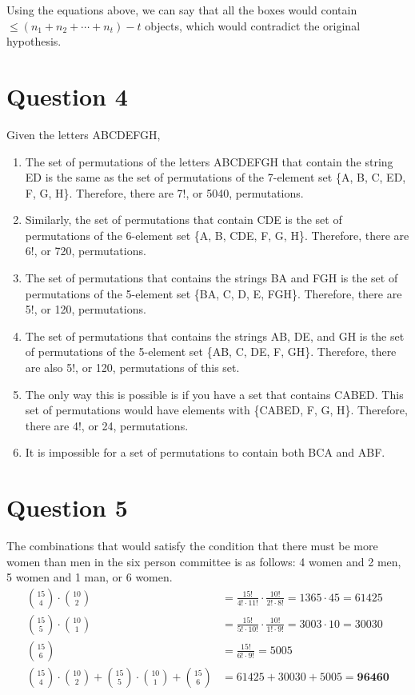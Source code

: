 \documentclass[letterpaper, 12pt]{article}
\begin{document}
Using the equations above, we can say that all the boxes would contain $\leq (n_1 + n_2 + \cdots + n_t) - t$ objects, which would contradict the original hypothesis.

\section*{Question 4}
Given the letters ABCDEFGH,

\begin{enumerate}
    \item The set of permutations of the letters ABCDEFGH that contain the string ED is the same as the set of permutations of the 7-element set \{A, B, C, ED, F, G, H\}. Therefore, there are 7!, or 5040, permutations.
    \item Similarly, the set of permutations that contain CDE is the set of permutations of the 6-element set \{A, B, CDE, F, G, H\}. Therefore, there are 6!, or 720, permutations.
    \item The set of permutations that contains the strings BA and FGH is the set of permutations of the 5-element set \{BA, C, D, E, FGH\}. Therefore, there are 5!, or 120, permutations.
    \item The set of permutations that contains the strings AB, DE, and GH is the set of permutations of the 5-element set \{AB, C, DE, F, GH\}. Therefore, there are also 5!, or 120, permutations of this set.
    \item The only way this is possible is if you have a set that contains CABED. This set of permutations would have elements with \{CABED, F, G, H\}. Therefore, there are 4!, or 24, permutations.
    \item It is impossible for a set of permutations to contain both BCA and ABF.
\end{enumerate}

\section*{Question 5}
The combinations that would satisfy the condition that there must be more women than men in the six person committee is as follows: 4 women and 2 men, 5 women and 1 man, or 6 women.
\begin{align*}
\binom{15}{4} \cdot \binom{10}{2} &= \frac{15!}{4! \cdot 11!} \cdot \frac{10!}{2! \cdot 8!} = 1365 \cdot 45 = 61425\\
\binom{15}{5} \cdot \binom{10}{1} &= \frac{15!}{5! \cdot 10!} \cdot \frac{10!}{1! \cdot 9!} = 3003 \cdot 10 = 30030\\
\binom{15}{6} &= \frac{15!}{6! \cdot 9!} = 5005\\
\binom{15}{4} \cdot \binom{10}{2} + \binom{15}{5} \cdot \binom{10}{1} + \binom{15}{6} &= 61425 + 30030 + 5005 = \boxed{\mathbf{96460}}
\end{align*}
\end{document}
